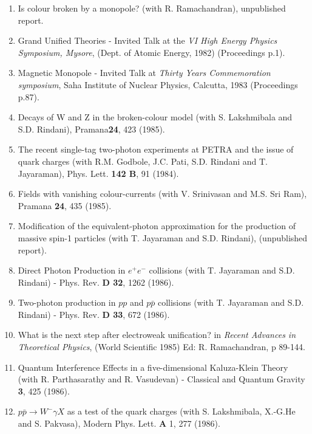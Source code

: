 \begin{enumerate}
\item Is colour broken by a monopole? (with R. Ramachandran),
unpublished report.

\item Grand Unified Theories - Invited Talk at the {\it VI High Energy
Physics Symposium, Mysore}, (Dept. of Atomic Energy, 1982) (Proceedings p.1).

\item Magnetic Monopole - Invited Talk at {\em Thirty Years
Commemoration symposium}, Saha Institute of Nuclear Physics, Calcutta,
1983 (Proceedings p.87).

\item Decays of W and Z in the broken-colour model (with S. Lakshmibala
and S.D. Rindani), Pramana{\bf 24}, 423 (1985).

\item The recent single-tag two-photon experiments at PETRA and the
issue of quark charges (with R.M. Godbole, J.C. Pati, S.D. Rindani and
T. Jayaraman), Phys. Lett. {\bf 142 B}, 91 (1984).

\item Fields with vanishing colour-currents (with V. Srinivasan and M.S.
Sri Ram), Pramana {\bf 24}, 435 (1985).
 
\item Modification of the equivalent-photon approximation for the
production of massive spin-1 particles (with T. Jayaraman and S.D.
Rindani), (unpublished report).

\item Direct Photon Production in $e^+ e^-$ collisions (with T.
Jayaraman and S.D. Rindani) - Phys. Rev. {\bf D 32}, 1262 (1986).

\item Two-photon production in $pp$ and $p\bar{p}$ collisions (with T.
Jayaraman and S.D. Rindani) - Phys. Rev. {\bf D 33}, 672 (1986).

\item What is the next step after electroweak unification? in {\em
Recent Advances in Theoretical Physics}, (World Scientific 1985) Ed: R.
Ramachandran, p 89-144.

\item Quantum Interference Effects in a five-dimensional Kaluza-Klein
Theory (with R. Parthasarathy and R. Vasudevan) - Classical and Quantum
Gravity {\bf 3}, 425 (1986).

\item $p\bar{p} \rightarrow W^- \gamma X$ as a test of the quark
charges (with S. Lakshmibala, X.-G.He and S. Pakvasa), Modern Phys.
Lett. {\bf A} 1, 277 (1986).


\end{enumerate}
